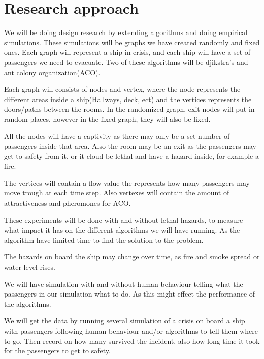 \chapter{Research approach}
\label{ch:approach}




We will be doing design research by extending algorithms and doing empirical simulations. These simulations will be graphs we have created randomly and fixed ones. Each graph will represent a ship in crisis, and each ship will have a set of passengers we need to evacuate.
Two of these algorithms will be djikstra's and ant colony organization(ACO).

Each graph will consists of nodes and vertex, where the node represents the different areas inside a ship(Hallways, deck, ect) and the vertices represents the doors/paths between the rooms. In the randomized graph, exit nodes will put in random places, however in the fixed graph, they will also be fixed. 

All the nodes will have a captivity as there may only be a set number of passengers inside that area. Also the room may be an exit as the passengers may get to safety from it, or it cloud be lethal and have a hazard inside, for example a fire.

The vertices will contain a flow value the represents how many passengers may move trough at each time step. Also vertexes will contain the amount of attractiveness and pheromones for ACO.

These experiments will be done with and without lethal hazards, to measure what impact it has on the different algorithms we will have running. As the algorithm have limited time to find the solution to the problem.

The hazards on board the ship may change over time, as fire and smoke spread or water level rises.

We will have simulation with and without human behaviour telling what the passengers in our simulation what to do. As this might effect the performance of the algorithms.

We will get the data by running several simulation of a crisis on board a ship with passengers following human behaviour and/or algorithms to tell them where to go. Then record on how many survived the incident, also how long time it took for the passengers to get to safety. 

